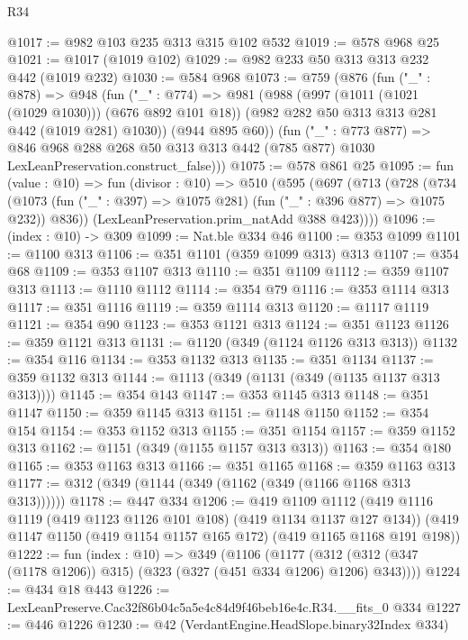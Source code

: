 \begin{lexlean}{R34}
\begin{coremodule}
@1017 := @982 @103 @235 @313 @315 @102 @532
@1019 := @578 @968 @25
@1021 := @1017 (@1019 @102)
@1029 := @982 @233 @50 @313 @313 @232 @442 (@1019 @232)
@1030 := @584 @968
@1073 := @759
    (@876
      (fun ("_" : @878) =>
      @948
        (fun ("_" : @774) =>
        @981
          (@988
            (@997 (@1011 (@1021 (@1029 @1030))) (@676 @892 @101 @18))
            (@982 @282 @50 @313 @313 @281 @442 (@1019 @281) @1030))
          (@944 @895 @60))
        (fun ("_" : @773 @877) =>
        @846
          @968
          @288
          @268
          @50
          @313
          @313
          @442
          (@785 @877)
          @1030
          LexLeanPreservation.construct_false)))
@1075 := @578 @861 @25
@1095 := fun (value : @10) =>
  fun (divisor : @10) =>
  @510
    (@595
      (@697
        (@713
          (@728
            (@734
              (@1073 (fun ("_" : @397) => @1075 @281) (fun ("_" : @396 @877) => @1075 @232))
              @836))
          (LexLeanPreservation.prim_natAdd @388 @423))))
@1096 := (index : @10) -> @309
@1099 := Nat.ble @334 @46
@1100 := @353 @1099
@1101 := @1100 @313
@1106 := @351 @1101 (@359 @1099 @313) @313
@1107 := @354 @68
@1109 := @353 @1107 @313
@1110 := @351 @1109
@1112 := @359 @1107 @313
@1113 := @1110 @1112
@1114 := @354 @79
@1116 := @353 @1114 @313
@1117 := @351 @1116
@1119 := @359 @1114 @313
@1120 := @1117 @1119
@1121 := @354 @90
@1123 := @353 @1121 @313
@1124 := @351 @1123
@1126 := @359 @1121 @313
@1131 := @1120 (@349 (@1124 @1126 @313 @313))
@1132 := @354 @116
@1134 := @353 @1132 @313
@1135 := @351 @1134
@1137 := @359 @1132 @313
@1144 := @1113 (@349 (@1131 (@349 (@1135 @1137 @313 @313))))
@1145 := @354 @143
@1147 := @353 @1145 @313
@1148 := @351 @1147
@1150 := @359 @1145 @313
@1151 := @1148 @1150
@1152 := @354 @154
@1154 := @353 @1152 @313
@1155 := @351 @1154
@1157 := @359 @1152 @313
@1162 := @1151 (@349 (@1155 @1157 @313 @313))
@1163 := @354 @180
@1165 := @353 @1163 @313
@1166 := @351 @1165
@1168 := @359 @1163 @313
@1177 := @312 (@349 (@1144 (@349 (@1162 (@349 (@1166 @1168 @313 @313))))))
@1178 := @447 @334
@1206 := @419
    @1109
    @1112
    (@419 @1116 @1119 (@419 @1123 @1126 @101 @108) (@419 @1134 @1137 @127 @134))
    (@419 @1147 @1150 (@419 @1154 @1157 @165 @172) (@419 @1165 @1168 @191 @198))
@1222 := fun (index : @10) =>
  @349
    (@1106
      (@1177 (@312 (@312 (@347 (@1178 @1206)) @315) (@323 (@327 (@451 @334 @1206) @1206) @343))))
@1224 := @434 @18 @443
@1226 := LexLeanPreserve.Cac32f86b04c5a5e4c84d9f46beb16e4c.R34.__fits_0 @334
@1227 := @446 @1226
@1230 := @42 (VerdantEngine.HeadSlope.binary32Index @334)

\end{coremodule}
\end{lexlean}
